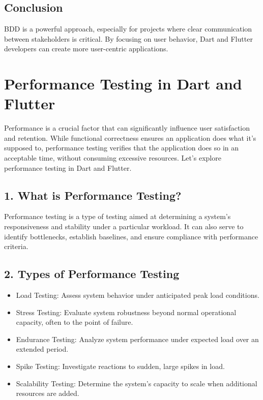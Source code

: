 \documentclass[
]{article}
\providecommand{\tightlist}{%
  \setlength{\itemsep}{0pt}\setlength{\parskip}{0pt}}
\begin{document}
\subsection{Conclusion}\label{conclusion-15}

BDD is a powerful approach, especially for projects where clear
communication between stakeholders is critical. By focusing on user
behavior, Dart and Flutter developers can create more user-centric
applications.

\section{Performance Testing in Dart and
Flutter}\label{performance-testing-in-dart-and-flutter}

Performance is a crucial factor that can significantly influence user
satisfaction and retention. While functional correctness ensures an
application does what it's supposed to, performance testing verifies
that the application does so in an acceptable time, without consuming
excessive resources. Let's explore performance testing in Dart and
Flutter.

\subsection{1. What is Performance
Testing?}\label{what-is-performance-testing}

Performance testing is a type of testing aimed at determining a system's
responsiveness and stability under a particular workload. It can also
serve to identify bottlenecks, establish baselines, and ensure
compliance with performance criteria.

\subsection{2. Types of Performance
Testing}\label{types-of-performance-testing}

\begin{itemize}
\tightlist
\item
  Load Testing: Assess system behavior under anticipated peak load
  conditions.
\item
  Stress Testing: Evaluate system robustness beyond normal operational
  capacity, often to the point of failure.
\item
  Endurance Testing: Analyze system performance under expected load over
  an extended period.
\item
  Spike Testing: Investigate reactions to sudden, large spikes in load.
\item
  Scalability Testing: Determine the system's capacity to scale when
  additional resources are added.
\end{itemize}
\end{document}
